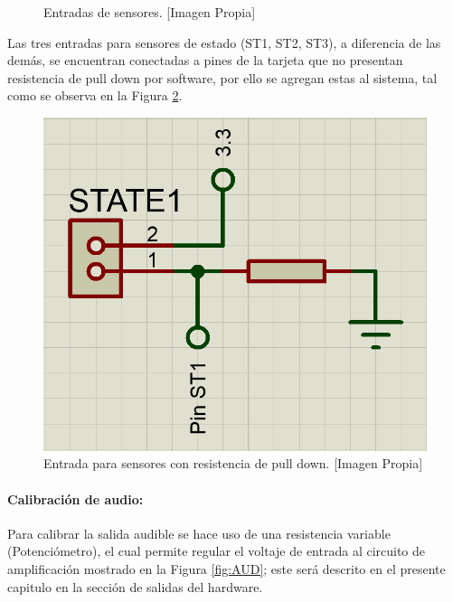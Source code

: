 		\begin{figure}[H]
			\centering
			\caption[Entradas de sensores.]{Entradas de sensores. [Imagen Propia]}
			\label{fig:SVS}
		\end{figure}
		
		Las tres entradas para sensores de estado (ST1, ST2, ST3), a diferencia de las demás, se encuentran conectadas a pines de la tarjeta que no presentan resistencia de pull down por software, por ello se agregan estas al sistema, tal como se observa en la Figura \ref{fig:ST}.\\
	
		\begin{figure}[H]
			\centering
			\caption[Entrada para sensores con resistencia de pull down.]{Entrada para sensores con resistencia de pull down. [Imagen Propia]}
			\label{fig:ST}
			\includegraphics[width=0.5\linewidth]{Imagenes/ST}
		\end{figure}		
	
	
	
	\paragraph{Calibración de audio:}
		Para calibrar la salida audible se hace uso de una resistencia variable (Potenciómetro), el cual permite regular el voltaje de entrada al circuito de amplificación mostrado en la Figura \ref{fig:AUD}; este será descrito en el presente capitulo en la sección de salidas del hardware.
